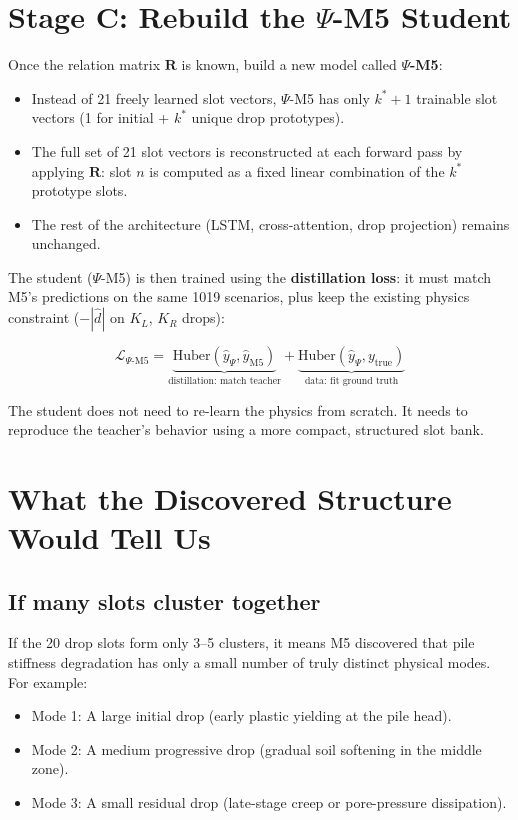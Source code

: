 \documentclass[11pt,a4paper]{article}
\begin{document}
\section{Stage C: Rebuild the $\Psi$-M5 Student}

Once the relation matrix $\mathbf{R}$ is known, build a new model called \textbf{$\Psi$-M5}:

\begin{itemize}[nosep]
    \item Instead of 21 freely learned slot vectors, $\Psi$-M5 has only $k^* + 1$ trainable slot vectors (1 for initial + $k^*$ unique drop prototypes).
    \item The full set of 21 slot vectors is reconstructed at each forward pass by applying $\mathbf{R}$: slot $n$ is computed as a fixed linear combination of the $k^*$ prototype slots.
    \item The rest of the architecture (LSTM, cross-attention, drop projection) remains unchanged.
\end{itemize}

The student ($\Psi$-M5) is then trained using the \textbf{distillation loss}: it must match M5's predictions on the same 1019 scenarios, plus keep the existing physics constraint ($-|\hat{d}|$ on $K_L$, $K_R$ drops):

$$
\mathcal{L}_{\Psi\text{-M5}} = \underbrace{\text{Huber}(\hat{y}_{\Psi}, \hat{y}_{\text{M5}})}_{\text{distillation: match teacher}} + \underbrace{\text{Huber}(\hat{y}_{\Psi}, y_{\text{true}})}_{\text{data: fit ground truth}}
$$

The student does not need to re-learn the physics from scratch. It needs to reproduce the teacher's behavior using a more compact, structured slot bank.

\section{What the Discovered Structure Would Tell Us}

\subsection*{If many slots cluster together}

If the 20 drop slots form only 3--5 clusters, it means M5 discovered that pile stiffness degradation has only a small number of truly distinct physical modes. For example:

\begin{itemize}[nosep]
    \item Mode 1: A large initial drop (early plastic yielding at the pile head).
    \item Mode 2: A medium progressive drop (gradual soil softening in the middle zone).
    \item Mode 3: A small residual drop (late-stage creep or pore-pressure dissipation).
\end{itemize}
\end{document}
